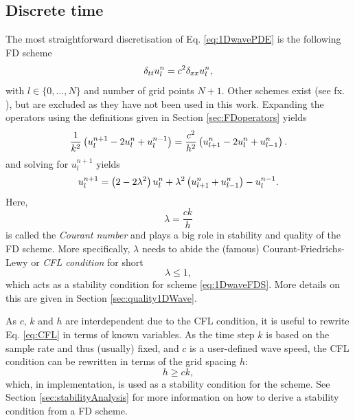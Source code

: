 \subsection{Discrete time}\label{sec:1DWaveDisc}
The most straightforward  discretisation of Eq. \eqref{eq:1DwavePDE} is the following FD scheme
\begin{equation}\label{eq:1DwaveFDS}
    \delta_{tt} u_l^n = c^2 \delta_{xx} u_l^n,
\end{equation}
with $l\in\{0, \hdots, N\}$ and number of grid points $N + 1$.
Other schemes exist (see fx. \cite{theBible}), but are excluded as they have not been used in this work. Expanding the operators using the definitions given in Section \ref{sec:FDoperators} yields
\begin{equation}
    \frac{1}{k^2}\left(u_l^{n+1}-2 u_l^n + u_l^{n-1}\right) = \frac{c^2}{h^2} \left(u_{l+1}^n - 2 u_l^n + u_{l-1}^n\right).
\end{equation}
and solving for $u_l^{n+1}$ yields
\begin{equation}\label{eq:1DwaveUpdate}
    u_l^{n+1} = \left(2-2\lambda^2\right) u_l^n  + \lambda^2\left(u_{l+1}^n + u_{l-1}^n\right) - u_l^{n-1}.
\end{equation}
Here, 
\begin{equation}\label{eq:courantNumber}
    \lambda = \frac{ck}{h}
\end{equation}
is called the \textit{Courant number} and plays a big role in stability and quality of the FD scheme. More specifically, $\lambda$ needs to abide the (famous) Courant-Friedrichs-Lewy or \textit{CFL condition} for short \cite{Courant1928}
\begin{equation}\label{eq:CFL}
    \lambda \leq 1,
\end{equation}
which acts as a stability condition for scheme \eqref{eq:1DwaveFDS}. More details on this are given in Section \ref{sec:quality1DWave}.

As $c$, $k$ and $h$ are interdependent due to the CFL condition, it is useful to rewrite Eq. \eqref{eq:CFL} in terms of known variables.
As the time step $k$ is based on the sample rate and thus (usually) fixed, and $c$ is a user-defined wave speed, the CFL condition can be rewritten in terms of the grid spacing $h$:
\begin{equation}\label{eq:1DWaveStabilityCond}
    h \geq ck,
\end{equation}
%
which, in implementation, is used as a stability condition for the scheme. See Section \ref{sec:stabilityAnalysis} for more information on how to derive a stability condition from a FD scheme.


